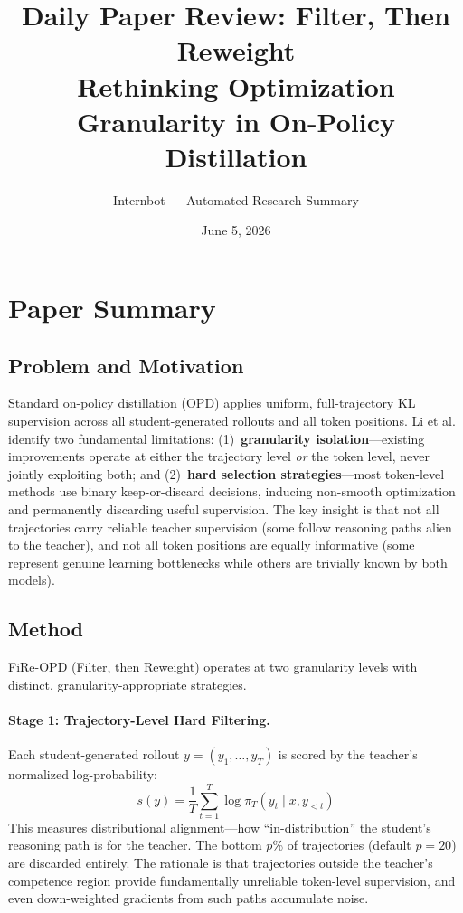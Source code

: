 \documentclass[11pt,a4paper]{article}
\title{Daily Paper Review: Filter, Then Reweight\\Rethinking Optimization Granularity in On-Policy Distillation}
\author{Internbot --- Automated Research Summary}
\date{June 5, 2026}
\begin{document}
\maketitle

\section{Paper Summary}

\subsection{Problem and Motivation}

Standard on-policy distillation (OPD) applies uniform, full-trajectory KL supervision across all student-generated rollouts and all token positions. Li et al.~\cite{li2026fire} identify two fundamental limitations: (1)~\textbf{granularity isolation}---existing improvements operate at either the trajectory level \emph{or} the token level, never jointly exploiting both; and (2)~\textbf{hard selection strategies}---most token-level methods use binary keep-or-discard decisions, inducing non-smooth optimization and permanently discarding useful supervision. The key insight is that not all trajectories carry reliable teacher supervision (some follow reasoning paths alien to the teacher), and not all token positions are equally informative (some represent genuine learning bottlenecks while others are trivially known by both models).

\subsection{Method}

FiRe-OPD (Filter, then Reweight) operates at two granularity levels with distinct, granularity-appropriate strategies.

\paragraph{Stage 1: Trajectory-Level Hard Filtering.}
Each student-generated rollout $y = (y_1, \ldots, y_T)$ is scored by the teacher's normalized log-probability:
\begin{equation}
s(y) = \frac{1}{T}\sum_{t=1}^{T} \log \pi_T(y_t \mid x, y_{<t})
\end{equation}
This measures distributional alignment---how ``in-distribution'' the student's reasoning path is for the teacher. The bottom $p$\% of trajectories (default $p{=}20$) are discarded entirely. The rationale is that trajectories outside the teacher's competence region provide fundamentally unreliable token-level supervision, and even down-weighted gradients from such paths accumulate noise.
\end{document}
